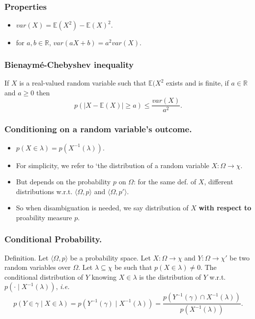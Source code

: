 \documentclass{beamer}
\begin{document}
\begin{frame}
  \frametitle{Properties}
  \begin{itemize}
  \item $var(X) = \mathbb{E}(X^2) - \mathbb{E}(X)^2$.
  \item for $a, b \in \mathbb{R}$, $var(aX + b) = a^2var(X)$.
  \end{itemize}
\end{frame}

\begin{frame}
  \frametitle{Bienaym\'e-Chebyshev inequality}
  If $X$ is a real-valued random variable such that $\mathbb{E}(X^2$ exists and is finite, if $a \in \mathbb{R}$ and $a \ge 0$ then
  \[p(|X - \mathbb{E}(X)| \ge a) \le \frac{var(X)}{a^2}.\]
\end{frame}

\begin{frame}
  \frametitle{Conditioning on a random variable's outcome.}
  \begin{itemize}
  \item $p(X \in \lambda) = p(X^{-1}(\lambda))$.
  \item For simplicity, we refer to `the distribution of a random variable $X: \Omega \rightarrow \chi$.
  \item But depends on the probability $p$ on $\Omega$: for the same def. of $X$, different distributions w.r.t. $\langle \Omega, p \rangle$ and $\langle \Omega, p' \rangle$.
  \item So when disambiguation is needed, we say distribution of $X$ \textbf{with respect to} proability measure $p$.
  \end{itemize}
\end{frame}

\begin{frame}
  \frametitle{Conditional Probability.}

  \begin{block}{Definition.}
    Let $\langle \Omega, p \rangle$ be a probability space. Let $X: \Omega \rightarrow \chi$ and $Y: \Omega \rightarrow \chi'$ be two random variables over $\Omega$. Let $\lambda \subseteq \chi$ be such that $p(X \in \lambda) \neq 0$.
    The conditional distribution of $Y$ knowing $X \in \lambda$ is the distribution of $Y$ w.r.t. $p( \cdot \mid X^{-1}(\lambda))$, \emph{i.e.}
    \[p(Y \in \gamma \mid X \in \lambda) = p(Y^{-1}(\gamma) \mid X^{-1}(\lambda)) = \frac{p(Y^{-1}(\gamma) \cap X^{-1}(\lambda))}{p(X^{-1}(\lambda))}.\]
  \end{block}
\end{frame}
\end{document}
